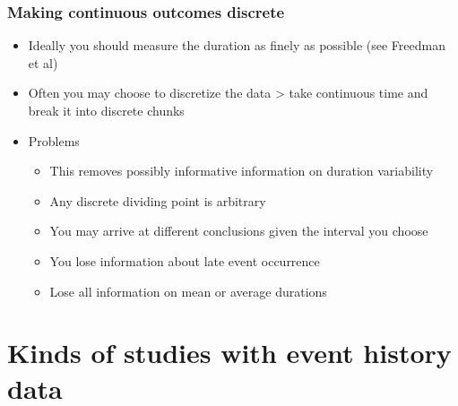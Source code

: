 \documentclass[
  letterpaper,
  DIV=11,
  numbers=noendperiod]{scrreprt}
\providecommand{\tightlist}{%
  \setlength{\itemsep}{0pt}\setlength{\parskip}{0pt}}\usepackage{longtable,booktabs,array}
\begin{document}
\hypertarget{making-continuous-outcomes-discrete}{%
\subsubsection{Making continuous outcomes
discrete}\label{making-continuous-outcomes-discrete}}

\begin{itemize}
\item
  Ideally you should measure the duration as finely as possible (see
  Freedman et al)
\item
  Often you may choose to discretize the data \textgreater{} take
  continuous time and break it into discrete chunks
\item
  Problems

  \begin{itemize}
  \tightlist
  \item
    This removes possibly informative information on duration
    variability
  \item
    Any discrete dividing point is arbitrary
  \item
    You may arrive at different conclusions given the interval you
    choose
  \item
    You lose information about late event occurrence
  \item
    Lose all information on mean or average durations
  \end{itemize}
\end{itemize}

\hypertarget{kinds-of-studies-with-event-history-data}{%
\section{Kinds of studies with event history
data}\label{kinds-of-studies-with-event-history-data}}
\end{document}
